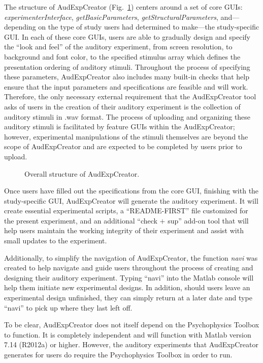 \documentclass[preprint,12pt, a4paper]{elsarticle}
\begin{document}
The structure of AudExpCreator (Fig.~\ref{fig:overview}) centers around a set of core GUIs: \textit{experimenterInterface}, \textit{getBasicParameters}, \textit{getStructuralParameters}, and---depending on the type of study users had determined to make---the study-specific GUI. In each of these core GUIs, users are able to gradually design and specify the ``look and feel'' of the auditory experiment, from screen resolution, to background and font color, to the specified stimulus array which defines the presentation ordering of auditory stimuli. Throughout the process of specifying these parameters, AudExpCreator also includes many built-in checks that help ensure that the input parameters and specifications are feasible and will work. Therefore, the only necessary external requirement that the AudExpCreator tool asks of users in the creation of their auditory experiment is the collection of auditory stimuli in .wav format. The process of uploading and organizing these auditory stimuli is facilitated by feature GUIs within the AudExpCreator; however, experimental manipulations of the stimuli themselves are beyond the scope of AudExpCreator and are expected to be completed by users prior to upload. 

\begin{figure}[h]
\centering
{}
\caption{Overall structure of AudExpCreator.}
\label{fig:overview}
\end{figure}

Once users have filled out the specifications from the core GUI, finishing with the study-specific GUI, AudExpCreator will generate the auditory experiment. It will create essential experimental scripts, a ``README-FIRST'' file customized for the present experiment, and an additional ``check $+$ sup'' add-on tool that will help users maintain the working integrity of their experiment and assist with small updates to the experiment. 

Additionally, to simplify the navigation of AudExpCreator, the function \textit{navi} was created to help navigate and guide users throughout the process of creating and designing their auditory experiment. Typing ``navi'' into the Matlab console will help them initiate new experimental designs. In addition, should users leave an experimental design unfinished, they can simply return at a later date and type ``navi'' to pick up where they last left off. 
	
To be clear, AudExpCreator does not itself depend on the Psychophysics Toolbox to function. It is completely independent and will function with Matlab version 7.14 (R2012a) or higher. However, the auditory experiments that AudExpCreator generates for users do require the Psychophysics Toolbox in order to run.
\end{document}
